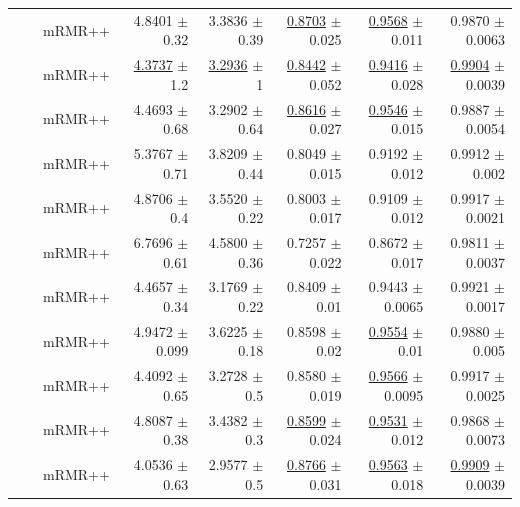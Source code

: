 \begin{longtable}{llp{}rrrrr}
 &  & mRMR++ & 4.8401 {\scriptsize $\pm$ 0.32} & 3.3836 {\scriptsize $\pm$ 0.39} & \underline{0.8703} {\scriptsize $\pm$ 0.025} & \underline{0.9568} {\scriptsize $\pm$ 0.011} & 0.9870 {\scriptsize $\pm$ 0.0063} \\
 &  & mRMR++ & \underline{4.3737} {\scriptsize $\pm$ 1.2} & \underline{3.2936} {\scriptsize $\pm$ 1} & \underline{0.8442} {\scriptsize $\pm$ 0.052} & \underline{0.9416} {\scriptsize $\pm$ 0.028} & \underline{0.9904} {\scriptsize $\pm$ 0.0039} \\
 &  & mRMR++ & 4.4693 {\scriptsize $\pm$ 0.68} & 3.2902 {\scriptsize $\pm$ 0.64} & \underline{0.8616} {\scriptsize $\pm$ 0.027} & \underline{0.9546} {\scriptsize $\pm$ 0.015} & 0.9887 {\scriptsize $\pm$ 0.0054} \\
 &  & mRMR++ & 5.3767 {\scriptsize $\pm$ 0.71} & 3.8209 {\scriptsize $\pm$ 0.44} & 0.8049 {\scriptsize $\pm$ 0.015} & 0.9192 {\scriptsize $\pm$ 0.012} & 0.9912 {\scriptsize $\pm$ 0.002} \\
 &  & mRMR++ & 4.8706 {\scriptsize $\pm$ 0.4} & 3.5520 {\scriptsize $\pm$ 0.22} & 0.8003 {\scriptsize $\pm$ 0.017} & 0.9109 {\scriptsize $\pm$ 0.012} & 0.9917 {\scriptsize $\pm$ 0.0021} \\
 &  & mRMR++ & 6.7696 {\scriptsize $\pm$ 0.61} & 4.5800 {\scriptsize $\pm$ 0.36} & 0.7257 {\scriptsize $\pm$ 0.022} & 0.8672 {\scriptsize $\pm$ 0.017} & 0.9811 {\scriptsize $\pm$ 0.0037} \\
 &  & mRMR++ & 4.4657 {\scriptsize $\pm$ 0.34} & 3.1769 {\scriptsize $\pm$ 0.22} & 0.8409 {\scriptsize $\pm$ 0.01} & 0.9443 {\scriptsize $\pm$ 0.0065} & 0.9921 {\scriptsize $\pm$ 0.0017} \\
 &  & mRMR++ & 4.9472 {\scriptsize $\pm$ 0.099} & 3.6225 {\scriptsize $\pm$ 0.18} & 0.8598 {\scriptsize $\pm$ 0.02} & \underline{0.9554} {\scriptsize $\pm$ 0.01} & 0.9880 {\scriptsize $\pm$ 0.005} \\
 &  & mRMR++ & 4.4092 {\scriptsize $\pm$ 0.65} & 3.2728 {\scriptsize $\pm$ 0.5} & 0.8580 {\scriptsize $\pm$ 0.019} & \underline{0.9566} {\scriptsize $\pm$ 0.0095} & 0.9917 {\scriptsize $\pm$ 0.0025} \\
 &  & mRMR++ & 4.8087 {\scriptsize $\pm$ 0.38} & 3.4382 {\scriptsize $\pm$ 0.3} & \underline{0.8599} {\scriptsize $\pm$ 0.024} & \underline{0.9531} {\scriptsize $\pm$ 0.012} & 0.9868 {\scriptsize $\pm$ 0.0073} \\
 &  & mRMR++ & 4.0536 {\scriptsize $\pm$ 0.63} & 2.9577 {\scriptsize $\pm$ 0.5} & \underline{0.8766} {\scriptsize $\pm$ 0.031} & \underline{0.9563} {\scriptsize $\pm$ 0.018} & \underline{0.9909} {\scriptsize $\pm$ 0.0039} \\

\end{longtable}
